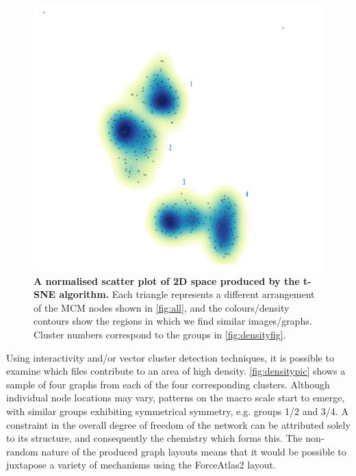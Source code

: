     \begin{figure}[H]
         \centering
    \includegraphics[width=.6\textwidth]{figures_c1/beijingtest/density.png}
     \caption{\textbf{A normalised scatter plot of 2D space produced by the t-SNE algorithm.} Each triangle represents a different arrangement of the MCM nodes shown in \autoref{fig:all}, and the colours/density contours show the regions in which we find similar images/graphs. Cluster numbers correspond to the groups in \autoref{fig:densityfig}. }
     \label{fig:densty}
     \end{figure}

Using interactivity and/or vector cluster detection techniques, it is possible to examine which files contribute to an area of high density. \autoref{fig:densitypic} shows a sample of four graphs from each of the four corresponding clusters. Although individual node locations may vary, patterns on the macro scale start to emerge, with similar groups exhibiting symmetrical symmetry, e.g. groups 1/2 and 3/4. A constraint in the overall degree of freedom of the network can be attributed solely to its structure, and consequently the chemistry which forms this. The non-random nature of the produced graph layouts means that it would be possible to juxtapose a variety of mechanisms using the ForceAtlas2 layout.

